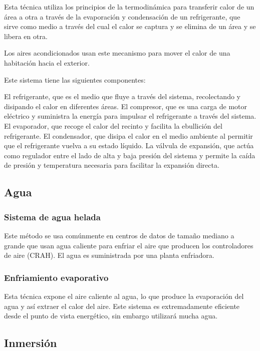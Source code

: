 Esta técnica utiliza los principios de la termodinámica para transferir calor de un área a otra a través de la evaporación y condensación de un refrigerante, que sirve como medio a través del cual el calor se captura y se elimina de un área y se libera en otra.

Los aires acondicionados usan este mecanismo para mover el calor de una habitación hacia el exterior.

Este sistema tiene las siguientes componentes:

El refrigerante, que es el medio que fluye a través del sistema, recolectando y disipando el calor en diferentes áreas.
El compresor, que es una carga de motor eléctrico y suministra la energía para impulsar el refrigerante a través del sistema.
El evaporador, que recoge el calor del recinto y facilita la ebullición del refrigerante.
El condensador, que disipa el calor en el medio ambiente al permitir que el refrigerante vuelva a su estado líquido.
La válvula de expansión, que actúa como regulador entre el lado de alta y baja presión del sistema y permite la caída de presión y temperatura necesaria para facilitar la expansión directa.


\subsection*{Agua}

\subsubsection*{Sistema de agua helada}

Este método se usa comúnmente en centros de datos de tamaño mediano a grande que usan agua caliente para enfriar el aire que producen los controladores de aire (CRAH). El agua es suministrada por una planta enfriadora.

\subsubsection*{Enfriamiento evaporativo}

Esta técnica expone el aire caliente al agua, lo que produce la evaporación del agua y así extraer el calor del aire. Este sistema es extremadamente eficiente desde el punto de vista energético, sin embargo utilizará mucha agua.

\subsection*{Inmersión}

